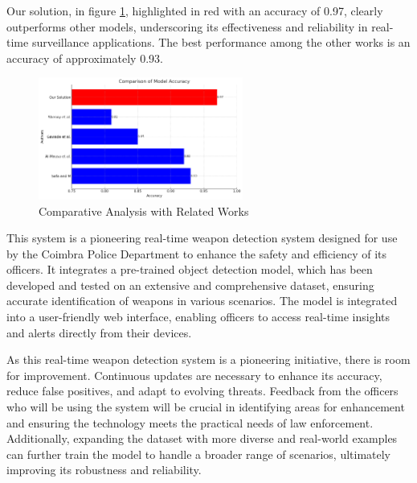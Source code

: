 Our solution, in figure \ref{fig:comparative-analysis}, highlighted in red with an accuracy of 0.97, clearly outperforms other models, underscoring its 
effectiveness and reliability in real-time surveillance applications. The best performance among 
the other works is an accuracy of approximately 0.93.

\begin{figure}[h]
    \centering 
    \includegraphics[width=0.6\textwidth]{figs/comparative-analysis.png} 
    \caption{Comparative Analysis with Related Works}
    \label{fig:comparative-analysis}
\end{figure}

This system is a pioneering real-time weapon detection system designed for use by the Coimbra Police Department to 
enhance the safety and efficiency of its officers. It integrates a pre-trained object detection model, 
which has been developed and tested on an extensive and comprehensive dataset, ensuring accurate identification of 
weapons in various scenarios. The model is integrated into a user-friendly web interface, enabling officers 
to access real-time insights and alerts directly from their devices.

As this real-time weapon detection system is a pioneering initiative, there is room for improvement. 
Continuous updates are necessary to enhance its accuracy, reduce false positives, and adapt 
to evolving threats. Feedback from the officers who will be using the system will be crucial in 
identifying areas for enhancement and ensuring the technology meets the practical needs of law enforcement. 
Additionally, expanding the dataset with more diverse and real-world examples can further train the model to 
handle a broader range of scenarios, ultimately improving its robustness and reliability. 
